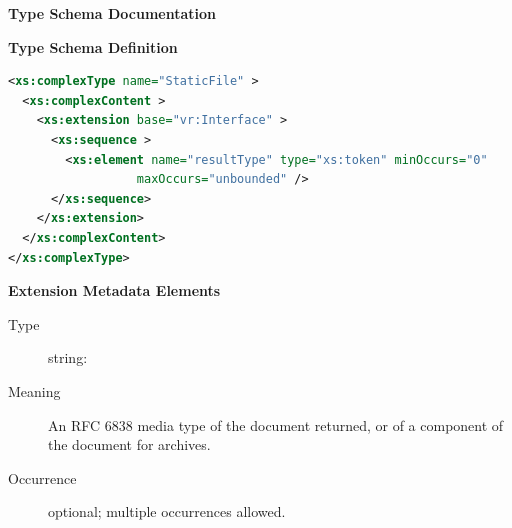 \documentclass{ivoa}
\begin{document}
\begin{generated}
\begingroup
        \renewcommand*\descriptionlabel[1]{%
        \hbox to 5.5em{\emph{#1}\hfil}}\vspace{2ex}\noindent\textbf{ Type Schema Documentation}



\vspace{1ex}\noindent\textbf{ Type Schema Definition}

\begin{lstlisting}[language=XML,basicstyle=\footnotesize]
<xs:complexType name="StaticFile" >
  <xs:complexContent >
    <xs:extension base="vr:Interface" >
      <xs:sequence >
        <xs:element name="resultType" type="xs:token" minOccurs="0"
                  maxOccurs="unbounded" />
      </xs:sequence>
    </xs:extension>
  </xs:complexContent>
</xs:complexType>
\end{lstlisting}

\vspace{0.5ex}\noindent\textbf{ Extension Metadata Elements}

\begingroup\small\begin{bigdescription}\item[Element \xmlel{resultType}]
\begin{description}
\item[Type] string: 
\item[Meaning]
                An RFC 6838 media type of the document returned, or of
                a component of the document for archives.

\item[Occurrence] optional; multiple occurrences allowed.

\end{description}


\end{bigdescription}\endgroup

\endgroup
\end{generated}
\end{document}
